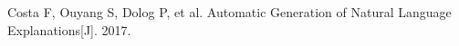 \documentclass[runningheads]{llncs}
\begin{document}
\begin{thebibliography}{25}
 Costa F, Ouyang S, Dolog P, et al. Automatic Generation of Natural Language Explanations[J]. 2017.
\bibitem{}
\bibitem{}
\bibitem{}
\bibitem{}
\end{thebibliography}
\end{document}
